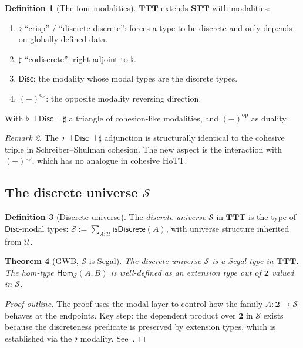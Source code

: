 \documentclass[12pt]{article}
\newtheorem{theorem}{Theorem}[section]
\theoremstyle{definition}
\newtheorem{definition}[theorem]{Definition}
\theoremstyle{remark}
\newtheorem{remark}[theorem]{Remark}
\newcommand{\U}{\mathcal{U}}
\newcommand{\Hom}{\mathsf{Hom}}
\newcommand{\op}{\mathrm{op}}
\newcommand{\isDisc}{\mathsf{isDiscrete}}
\newcommand{\Disc}{\mathsf{Disc}}
\newcommand{\STT}{\mathbf{STT}}
\newcommand{\TTT}{\mathbf{TTT}}
\newcommand{\twoI}{\mathbf{2}}
\begin{document}
\begin{definition}[The four modalities]\label{def:modalities}
$\TTT$ extends $\STT$ with modalities:
\begin{enumerate}
\item $\flat$ ``crisp'' / ``discrete-discrete'': forces a type to be discrete and only depends on globally defined data.
\item $\sharp$ ``codiscrete'': right adjoint to $\flat$.
\item $\Disc$: the modality whose modal types are the discrete types.
\item ${(-)}^{\op}$: the opposite modality reversing direction.
\end{enumerate}
With $\flat \dashv \Disc \dashv \sharp$ a triangle of cohesion-like modalities, and ${(-)}^{\op}$ as duality.
\end{definition}

\begin{remark}
The $\flat \dashv \Disc \dashv \sharp$ adjunction is structurally identical to the cohesive triple in Schreiber--Shulman cohesion. The new aspect is the interaction with ${(-)}^{\op}$, which has no analogue in cohesive HoTT\@.
\end{remark}

\subsection{\texorpdfstring{The discrete universe $\mathcal{S}$}{The discrete universe S}}

\begin{definition}[Discrete universe]\label{def:disc-universe}
The \emph{discrete universe} $\mathcal{S}$ in $\TTT$ is the type of $\Disc$-modal types: $\mathcal{S} := \sum_{A : \U} \isDisc(A)$, with universe structure inherited from $\U$.
\end{definition}

\begin{theorem}[GWB, $\mathcal{S}$ is Segal]\label{thm:s-segal}
The discrete universe $\mathcal{S}$ is a Segal type in $\TTT$. The hom-type $\Hom_{\mathcal{S}}(A, B)$ is well-defined as an extension type out of $\twoI$ valued in $\mathcal{S}$.
\end{theorem}

\begin{proof}[Proof outline]
The proof uses the modal layer to control how the family $A : \twoI \to \mathcal{S}$ behaves at the endpoints. Key step: the dependent product over $\twoI$ in $\mathcal{S}$ exists because the discreteness predicate is preserved by extension types, which is established via the $\flat$ modality. See~\cite[\S 6]{GWB2024}.
\end{proof}
\end{document}
